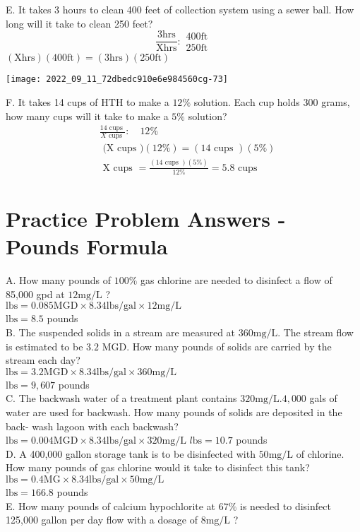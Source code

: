 E. It takes 3 hours to clean 400 feet of collection system using a sewer ball. How long will it take to clean 250 feet?
$$
\frac{3 \mathrm{hrs}}{\mathrm{Xhrs}}: \begin{gathered}
400 \mathrm{ft} \\
250 \mathrm{ft}
\end{gathered}
$$
$(\mathrm{X} \mathrm{hrs})(400 \mathrm{ft})=(3 \mathrm{hrs})(250 \mathrm{ft})$

\texttt{[image: 2022\_09\_11\_72dbedc910e6e984560cg-73]}

F. It takes 14 cups of $\mathrm{HTH}$ to make a $12 \%$ solution. Each cup holds 300 grams, how many cups will it take to make a $5 \%$ solution?
$$
\begin{aligned}
&\frac{14 \text { cups }}{X \text { cups }}: \quad 12 \% \\
&\text { (X cups })(12 \%)=(14 \text { cups })(5 \%) \\
&\text { X cups }=\frac{(14 \text { cups })(5 \%)}{12 \%}=5.8 \text { cups }
\end{aligned}
$$

\section{Practice Problem Answers - Pounds Formula}
A. How many pounds of $100 \%$ gas chlorine are needed to disinfect a flow of 85,000 gpd at $12 \mathrm{mg} / \mathrm{L}$ ?\\
$\mathrm{lbs}=0.085 \mathrm{MGD} \times 8.34 \mathrm{lbs} / \mathrm{gal} \times 12 \mathrm{mg} / \mathrm{L}$\\
$\mathrm{lbs}=8.5$ pounds\\
B. The suspended solids in a stream are measured at $360 \mathrm{mg} / \mathrm{L}$. The stream flow is estimated to be $3.2$ MGD. How many pounds of solids are carried by the stream each day?\\
$\mathrm{lbs}=3.2 \mathrm{MGD} \times 8.34 \mathrm{lbs} / \mathrm{gal} \times 360 \mathrm{mg} / \mathrm{L}$\\
$\mathrm{lbs}=9,607$ pounds\\
C. The backwash water of a treatment plant contains $320 \mathrm{mg} / \mathrm{L} .4,000$ gals of water are used for backwash. How many pounds of solids are deposited in the back- wash lagoon with each backwash?\\
$\mathrm{lbs}=0.004 \mathrm{MGD} \times 8.34 \mathrm{lbs} / \mathrm{gal} \times 320 \mathrm{mg} / \mathrm{L}$ $l \mathrm{bs}=10.7$ pounds\\
D. A 400,000 gallon storage tank is to be disinfected with $50 \mathrm{mg} / \mathrm{L}$ of chlorine. How many pounds of gas chlorine would it take to disinfect this tank?\\
$\mathrm{lbs}=0.4 \mathrm{MG} \times 8.34 \mathrm{lbs} / \mathrm{gal} \times 50 \mathrm{mg} / \mathrm{L}$\\
$\mathrm{lbs}=166.8$ pounds\\
E. How many pounds of calcium hypochlorite at $67 \%$ is needed to disinfect 125,000 gallon per day flow with a dosage of $8 \mathrm{mg} / \mathrm{L}$ ?

